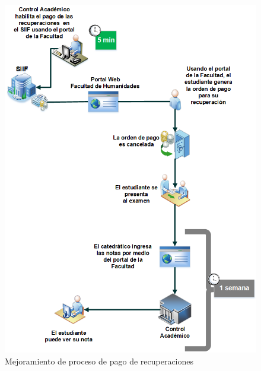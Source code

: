 \documentclass[11pt,spanish,Letterpaper,openany]{book}
\begin{document}
\begin{figure}[H]

{\centering \includegraphics[width=0.6\linewidth]{images/201901-rherrera-imagen02} 

}

\caption{Mejoramiento de proceso de pago de recuperaciones}\label{fig:unnamed-chunk-31}
\end{figure}
\end{document}

